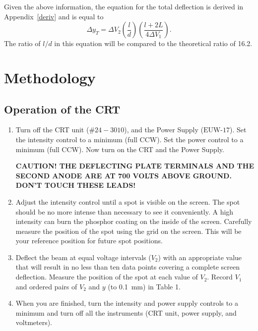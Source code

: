 \documentclass[twocolumn,english]{IEEEtran}
\theoremstyle{plain}
\theoremstyle{plain}
\begin{document}
Given the above information, the equation for the total deflection is derived in Appendix~\ref{deriv} and is equal to
\begin{equation}\label{ydeflection}
  \Delta y_T = \Delta V_2 (\frac{l}{d})(\frac{l+2L}{4\Delta V_1}).
\end{equation}
The ratio of $l/d$ in this equation will be compared to the theoretical ratio of \num{16.2}.
\section{Methodology}

\subsection{Operation of the CRT}
  \begin{enumerate}
  \item
    Turn off the CRT unit ($\#24-3010$), and the Power Supply ($\text{EUW-}17$).
    Set the intensity control to a minimum (full CCW).  Set the power control to a minimum (full CCW).
    Now turn on the CRT and the Power Supply.\vspace{2pt}

    \textbf{CAUTION!  THE DEFLECTING PLATE TERMINALS AND THE SECOND ANODE ARE AT \num{700} VOLTS ABOVE GROUND.
    DON'T TOUCH THESE LEADS!}\vspace{2pt}
  \item
    Adjust the intensity control until a spot is visible on the screen.
    The spot should be no more intense than necessary to see it conveniently.
    A high intensity can burn the phosphor coating on the inside of the screen.
    Carefully measure the position of the spot using the grid on the screen.
    This will be your reference position for future spot positions.\vspace{2pt}

  \item
    Deflect the beam at equal voltage intervals ($V_2$) with an appropriate value that will result in no less than ten data points covering a complete screen deflection. Measure the position of the spot at each value of $V_2$. Record $V_1$ and ordered pairs of $V_2$ and $y$ (to \SI{0.1}{\milli\metre}) in Table 1.\vspace{2pt}

  \item
    When you are finished, turn the intensity and power supply controls to a minimum and turn off all the instruments (CRT unit, power supply, and voltmeters).
  \end{enumerate}
\end{document}
